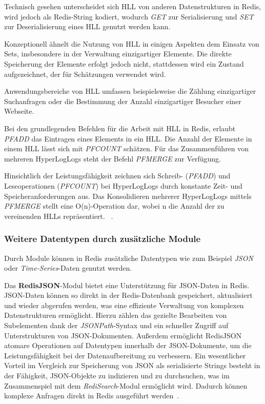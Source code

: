 Technisch gesehen unterscheidet sich \ac{HLL} von anderen Datenstrukturen in Redis, wird jedoch als Redis-String kodiert, wodurch \emph{GET} zur Serialisierung und \emph{SET} zur Deserialisierung eines \ac{HLL} genutzt werden kann.

Konzeptionell ähnelt die Nutzung von \ac{HLL} in einigen Aspekten dem Einsatz von Sets, insbesondere in der Verwaltung einzigartiger Elemente. Die direkte Speicherung der Elemente erfolgt jedoch nicht, stattdessen wird ein Zustand aufgezeichnet, der für Schätzungen verwendet wird.

Anwendungsbereiche von \ac{HLL} umfassen beispielsweise die Zählung einzigartiger Suchanfragen oder die Bestimmung der Anzahl einzigartiger Besucher einer Webseite.

Bei den grundlegenden Befehlen für die Arbeit mit \ac{HLL} in Redis, erlaubt \emph{PFADD} das Eintragen eines Elements in ein \ac{HLL}. Die Anzahl der Elemente in einem \ac{HLL} lässt sich mit \emph{PFCOUNT} schätzen. Für das Zusammenführen von mehreren HyperLogLogs steht der Befehl \emph{PFMERGE} zur Verfügung.

Hinsichtlich der Leistungsfähigkeit zeichnen sich Schreib- (\emph{PFADD}) und Leseoperationen (\emph{PFCOUNT}) bei HyperLogLogs durch konstante Zeit- und Speicheranforderungen aus. Das Konsolidieren mehrerer HyperLogLogs mittels \emph{PFMERGE} stellt eine O(n)-Operation dar, wobei n die Anzahl der zu vereinenden HLLs repräsentiert.
~\cite{redis_ltd_hyperloglog_nodate}.


\subsubsection{Weitere Datentypen durch zusätzliche Module}
Durch Module können in Redis zusätzliche Datentypen wie zum Beispiel \emph{JSON} oder \emph{Time-Series}-Daten genutzt werden.

Das \textbf{RedisJSON}-Modul bietet eine Unterstützung für JSON-Daten in Redis.
JSON-Daten können so direkt in der Redis-Datenbank gespeichert, aktualisiert und wieder abgerufen werden, was eine effiziente Verwaltung von komplexen Datenstrukturen ermöglicht. Hierzu zählen das gezielte Bearbeiten von Subelementen dank der \emph{JSONPath}-Syntax und ein schneller Zugriff auf Unterstrukturen von JSON-Dokumenten.
Außerdem ermöglicht RedisJSON atomare Operationen auf Datentypen innerhalb der JSON-Dokumente, um die Leistungsfähigkeit bei der Datenaufbereitung zu verbessern.
Ein wesentlicher Vorteil im Vergleich zur Speicherung von JSON als serialisierte Strings besteht in der Fähigkeit, JSON-Objekte zu indizieren und zu durchsuchen, was im Zusammenspiel mit dem \emph{RediSearch}-Modul ermöglicht wird.
Dadurch können komplexe Anfragen direkt in Redis ausgeführt werden~\cite{redis_ltd_json_nodate, redis_json-use-cases_nodate}.

